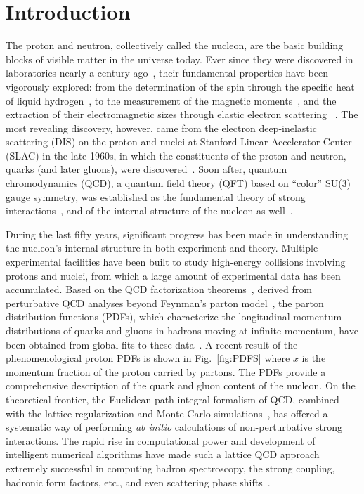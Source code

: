 \section{Introduction}
\label{sec:intro}
The proton and neutron, collectively called the nucleon, are the basic
building blocks of visible matter in the universe today. Ever since they were
discovered in laboratories nearly a century ago~\cite{Rutherford:1919fnt,Chadwick:1932ma}, their fundamental
properties have been vigorously explored:
from the determination of the spin through the specific heat of liquid hydrogen~\cite{Dennison},
to the measurement of the magnetic moments~\cite{Stern}, and the extraction of their electromagnetic sizes through elastic electron scattering
~\cite{Hofstadter:1956qs}. The most revealing discovery, however, came from the
electron deep-inelastic scattering (DIS) on the proton and nuclei at Stanford Linear Accelerator
Center (SLAC) in the late 1960s, in which the constituents of the
proton and neutron, quarks (and later gluons), were discovered~\cite{Bloom:1969kc}.
Soon after, quantum chromodynamics (QCD), a
quantum field theory (QFT) based on ``color'' SU(3) gauge symmetry,
was established as the fundamental theory of strong interactions~\cite{Fritzsch:1973pi,Gross:1973id,Politzer:1973fx},
and of the internal structure of the nucleon as well~\cite{Thomas:2001kw}.

During the last fifty years, significant progress has been made
in understanding the nucleon's internal structure in both experiment and theory.
Multiple experimental facilities have been built to study
high-energy collisions involving protons and nuclei, from which
a large amount of experimental data has been accumulated.
Based on the QCD factorization theorems~\cite{Collins:2011zzd}, derived from perturbative QCD
analyses beyond Feynman's parton model~\cite{Feynman:1973xc},
the parton distribution functions (PDFs), which characterize the
longitudinal momentum distributions of quarks and gluons in hadrons moving at
infinite momentum, have been obtained from global fits
to these data~\cite{Gao:2017yyd, Hou:2019efy, Harland-Lang:2014zoa, Ball:2017nwa}. A recent
result of the phenomenological proton PDFs is shown in Fig.~\ref{fig:PDFS} where $x$
is the momentum fraction of the proton carried by partons.
The PDFs provide a comprehensive
description of the quark and gluon content of the nucleon.
On the theoretical frontier, the Euclidean path-integral formalism of QCD, combined with the lattice
regularization and Monte Carlo simulations~\cite{Wilson:1974sk}, has
offered a systematic way of performing {\it ab initio} calculations of non-perturbative strong interactions.
The rapid rise in computational power and development of intelligent numerical
algorithms have made such a lattice QCD approach extremely successful in computing hadron
spectroscopy, the strong coupling, hadronic form factors,
etc., and even scattering phase shifts~\cite{Tanabashi:2018oca,Briceno:2017max,Aoki:2019cca}.

